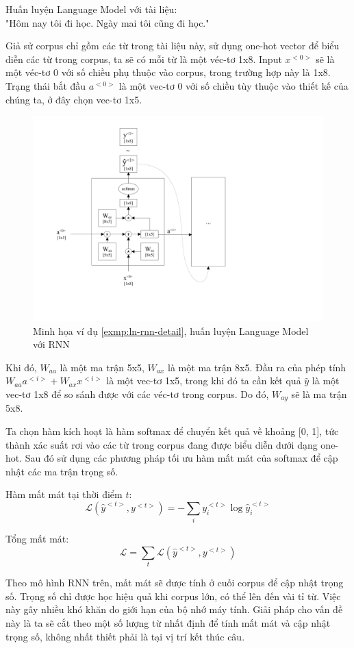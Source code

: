 \begin{exmp}
\label{exmp:ln-rnn-detail}
Huấn luyện Language Model với tài liệu:\\ "Hôm nay tôi đi học. Ngày mai tôi cũng đi học."\par
Giả sử corpus chỉ gồm các từ trong tài liệu này, sử dụng one-hot vector để biểu diễn các từ trong corpus, ta sẽ có mỗi từ là một véc-tơ 1x8. Input $x^{<0>}$ sẽ là một véc-tơ 0 với số chiều phụ thuộc vào corpus, trong trường hợp này là 1x8.
Trạng thái bắt đầu $a^{<0>}$ là một vec-tơ 0 với số chiều tùy thuộc vào thiết kế của chúng ta, ở đây chọn vec-tơ 1x5.\par

\begin{figure}[h!]
    \centering
    \includegraphics[width=13cm]{books/artificial-neural-network/chapter07/figure-sec12/lm-rnn-detail.pdf}
    \caption{Minh họa ví dụ \ref{exmp:ln-rnn-detail}, huấn luyện Language Model với RNN}
    \label{fig:lm-rnn-detail}
\end{figure}

Khi đó, $W_{aa}$ là một ma trận 5x5, $W_{ax}$ là một ma trận 8x5. Đầu ra của phép tính $W_{aa}a^{<i>} + W_{ax}x^{<i>}$ là một vec-tơ 1x5, trong khi đó ta cần kết quả $\hat{y}$ là một vec-tơ 1x8 để so sánh được với các véc-tơ trong corpus. Do đó, $W_{ay}$ sẽ là ma trận 5x8.\par
Ta chọn hàm kích hoạt là hàm softmax để chuyển kết quả về khoảng [0, 1], tức thành xác suất rơi vào các từ trong corpus đang được biểu diễn dưới dạng one-hot. Sau đó sử dụng các phương pháp tối ưu hàm mất mát của softmax để cập nhật các ma trận trọng số.
\end{exmp}
Hàm mất mát tại thời điểm $t$:
$$
\mathcal{L}(\hat{y}^{<t>}, y^{<t>}) = - \sum\limits_{i}{y_i^{<t>}\log{\hat{y}_i^{<t>}}}
$$\par
Tổng mất mát:
$$
\mathcal{L} = \sum\limits_{t}{\mathcal{L}(\hat{y}^{<t>}, y^{<t>})}
$$

Theo mô hình RNN trên, mất mát sẽ được tính ở cuối corpus để cập nhật trọng số. Trọng số chỉ được học hiệu quả khi corpus lớn, có thể lên đến vài tỉ từ. Việc này gây nhiều khó khăn do giới hạn của bộ nhớ máy tính. Giải pháp cho vấn đề này là ta sẽ cắt theo một số lượng từ nhất định để tính mất mát và cập nhật trọng số, không nhất thiết phải là tại vị trí kết thúc câu.
